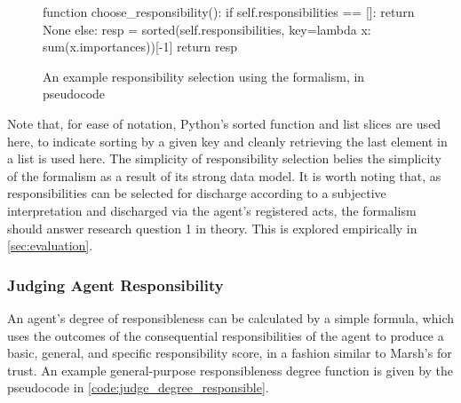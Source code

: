 \begin{figure}[h]
    \centering
    \begin{pseudocodelisting}
    function choose_responsibility():
        if self.responsibilities == []:
            return None
        else:
            resp = sorted(self.responsibilities,
                          key=lambda x: sum(x.importances))[-1]
            return resp
    \end{pseudocodelisting}
    \caption{An example responsibility selection using the formalism, in pseudocode}
    \label{code:responsibility_selection}
\end{figure}

Note that, for ease of notation, Python's sorted function and list slices are used here, to indicate sorting by a given key and cleanly retrieving the last element in a list is used here. The simplicity of responsibility selection belies the simplicity of the formalism as a result of its strong data model. It is worth noting that, as responsibilities can be selected for discharge according to a subjective interpretation and discharged via the agent's registered acts, the formalism should answer research question 1 in theory. This is explored empirically in \cref{sec:evaluation}.\par

\subsubsection{Judging Agent Responsibility}  %
An agent's degree of responsibleness can be calculated by a simple formula, which uses the outcomes of the consequential responsibilities of the agent to produce a basic, general, and specific responsibility score, in a fashion similar to Marsh's for trust\cite{Marsh1994FormalisingConcept}. An example general-purpose responsibleness degree function is given by the pseudocode in \cref{code:judge_degree_responsible}.\par

